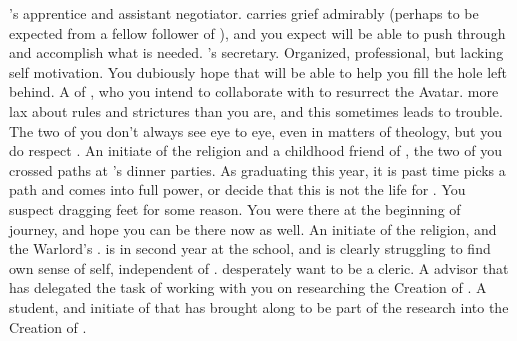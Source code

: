 \documentclass[char]{GL2020}
\begin{document}
\begin{contacts}
    \contact{\cJuniorStatesman{}} \cHeadDiplomat{}'s apprentice and assistant negotiator. \cJuniorStatesman{} carries \cJuniorStatesman{\their} grief admirably (perhaps to be expected from a fellow follower of \cEbb{}), and you expect \cJuniorStatesman{\they} will be able to push through and accomplish what is needed. 
    \contact{\cChupLeader{}} \cHeadDiplomat{}'s secretary. Organized, professional, but lacking self motivation. You dubiously hope that \cChupLeader{\they} will be able to help you fill the hole \cHeadDiplomat{} left behind.
    \contact{\cFlowPriest{}} A \cFlowPriest{\cleric} of \cFlow{}, who you intend to collaborate with to resurrect the \cEbb{} Avatar. \cFlowPriest{\Theyare} more lax about rules and strictures than you are, and this sometimes leads to trouble. The two of you don't always see eye to eye, even in matters of theology, but you do respect \cFlowPriest{\them}.
    \contact{\cInitiate{}} An initiate of the \pShippie{} religion and a childhood friend of \cPresident{}, the two of you crossed paths at \cHeadDiplomat{}’s dinner parties. As \cInitiate{\theyare} graduating this year, it is past time \cInitiate{} picks a path and comes into \cInitiate{\their} full power, or decide that this is not the life for \cInitiate{\them}. You suspect \cInitiate{\theyare} dragging \cInitiate{\their} feet for some reason. You were there at the beginning of \cInitiate{\their} journey, and hope you can be there now as well. 
     \contact{\cWarlordDaughter{}} An initiate of the \pShippie{} religion, and the Warlord's \cWarlordDaughter{\offspring}. \cWarlordDaughter{} is in \cWarlordDaughter{\their} second year at the school, and is clearly struggling to find \cWarlordDaughter{\their} own sense of self, independent of \cWarlordDaughter{\their} \cLoud{\parent}. \cWarlordDaughter{\They} desperately want\cWarlordDaughter{\verbs} to be a cleric. 
    \contact{\cHeadScientist{}} A \pTech{} advisor that \cBeetle{} has delegated the task of working with you on researching the Creation of \pEarth{}.
    \contact{\cScholarship{}} A \pTech{} student, and initiate of \cTechGod{} that \cHeadScientist{} has brought along to be part of the research into the Creation of \pEarth{}.
\end{contacts}
\end{document}
